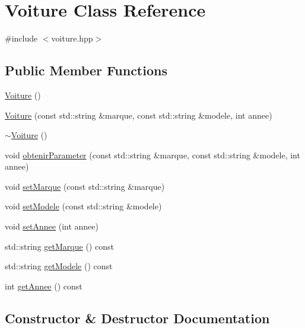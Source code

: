 \hypertarget{classVoiture}{}\section{Voiture Class Reference}
\label{classVoiture}


{\ttfamily \#include $<$voiture.\+hpp$>$}

\subsection*{Public Member Functions}
\begin{DoxyCompactItemize}
\item 
\hyperlink{classVoiture_a5bcf57fecc474ac7dba49ca67529e31b}{Voiture} ()
\item 
\hyperlink{classVoiture_a19c0ef4e204cf46085252606f1118cbd}{Voiture} (const std\+::string \&marque, const std\+::string \&modele, int annee)
\item 
\hyperlink{classVoiture_afe85820a993b6908d0fdb524245e5133}{$\sim$\+Voiture} ()
\item 
void \hyperlink{classVoiture_a3a0a10aad90441b4eff420080acf250f}{obtenir\+Parameter} (const std\+::string \&marque, const std\+::string \&modele, int annee)
\item 
void \hyperlink{classVoiture_ae33ad51d151330c8f2aa5159711b2e45}{set\+Marque} (const std\+::string \&marque)
\item 
void \hyperlink{classVoiture_aab456718793ba70c0fe6bdfefd579a25}{set\+Modele} (const std\+::string \&modele)
\item 
void \hyperlink{classVoiture_aa8fcdac2ea378e472732cbea73f35952}{set\+Annee} (int annee)
\item 
std\+::string \hyperlink{classVoiture_a59480eb63351dd4751176b7a71aa12ae}{get\+Marque} () const
\item 
std\+::string \hyperlink{classVoiture_a4ac24e5018ddea75c7d2484d42f08a13}{get\+Modele} () const
\item 
int \hyperlink{classVoiture_abcfb02d479b44ffd338bf5aa52344fff}{get\+Annee} () const
\end{DoxyCompactItemize}


\subsection{Constructor \& Destructor Documentation}
\mbox{\label{classVoiture_a5bcf57fecc474ac7dba49ca67529e31b}} 
